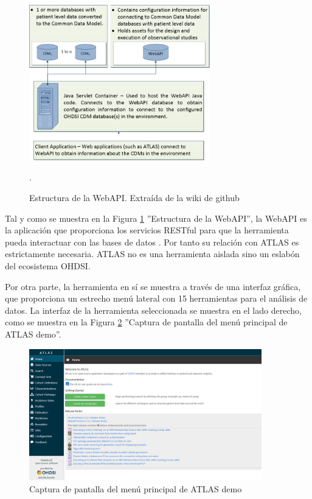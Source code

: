 \begin{figure}[H]
    \centering
    \includegraphics[width=0.700\textwidth]{figures/webAPIwiki.png}
     \caption{Estructura de la WebAPI. Extraída de la wiki de github \parencite{githubWebAPIwiki}}.
    \label{fig:webAPIwiki}
\end{figure}

Tal y como se muestra en la Figura \ref{fig:webAPIwiki} ''Estructura de la WebAPI'', la WebAPI es la aplicación que proporciona los servicios RESTful para que la herramienta pueda interactuar con las bases de datos \parencite{githubWebAPIwiki}. Por tanto su relación con ATLAS es estrictamente necesaria. ATLAS no es una herramienta aislada sino un eslabón del ecosistema OHDSI.

Por otra parte, la herramienta en sí se muestra a través de una interfaz gráfica, que proporciona un estrecho menú lateral con 15 herramientas para el análisis de datos. La interfaz de la herramienta seleccionada se muestra en el lado derecho, como se muestra en la Figura \ref{fig:ATLASdemoHome} ''Captura de pantalla del menú principal de ATLAS demo''.

\begin{figure}[H]
\centering
\includegraphics[width=0.90\textwidth]{figures/ATLASdemoHome.png}
     \caption{Captura de pantalla del menú principal de ATLAS demo}
    \label{fig:ATLASdemoHome}
\end{figure}

